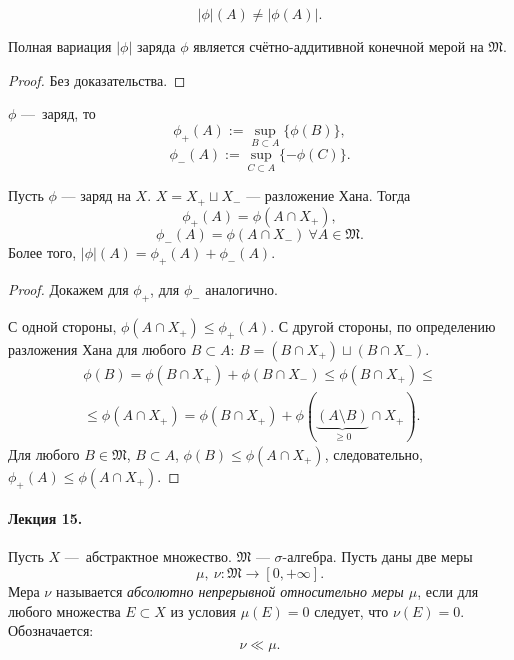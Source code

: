 \begin{remark}
    \[|\phi|(A) \neq |\phi(A)|.\]
\end{remark}

\begin{theorem}
    Полная вариация $|\phi|$ заряда $\phi$ является счётно-аддитивной конечной мерой на $\mathfrak{M}$.
\end{theorem} 
\begin{proof}
    Без доказательства.
\end{proof} 

\begin{remark}
    $\phi$ — заряд, то
    \[\phi_+(A) := \sup\limits_{B \subset A} \{\phi(B)\},\]
    \[\phi_-(A) := \sup\limits_{C \subset A} \{-\phi(C)\}.\]
\end{remark}

\begin{theorem}
    Пусть $\phi$ — заряд на $X$. $X = X_+ \sqcup X_-$ — разложение Хана.
    Тогда
    \[\phi_+(A) = \phi(A \cap X_+),\]
    \[\phi_-(A) = \phi(A \cap X_-) \ \forall A \in \mathfrak{M}.\]
    Более того, $|\phi|(A) = \phi_+(A) + \phi_-(A)$.
\end{theorem} 
\begin{proof}
    Докажем для $\phi_+$, для $\phi_-$ аналогично.
    
    С одной стороны, $\phi(A \cap X_+) \leqslant \phi_+(A)$.
    С другой стороны, по определению разложения Хана для любого $B \subset A$: $B = (B \cap X_+) \sqcup (B \cap X_-)$.
    \begin{multline*}
        \phi(B) = \phi(B \cap X_+) + \phi(B \cap X_-) \leqslant \phi(B \cap X_+) 
        \leqslant\\\leqslant
        \phi(A \cap X_+) = \phi(B \cap X_+) + \phi(\underbrace{(A \setminus B)}_{\geqslant 0} \cap X_+).
    \end{multline*} 
    Для любого $B \in \mathfrak{M}$, $B \subset A$, $\phi(B) \leqslant \phi(A \cap X_+)$, следовательно, $\phi_+(A) \leqslant \phi(A \cap X_+)$.
\end{proof} 

\paragraph{Лекция 15.}
\begin{definition}
    Пусть $X$ — абстрактное множество. $\mathfrak{M}$ — $\sigma$-алгебра. Пусть даны две меры
    \[\mu, \ \nu: \mathfrak{M} \to [0, +\infty].\]
    Мера $\nu$ называется \textit{абсолютно непрерывной относительно меры $\mu$}, если для любого множества $E \subset X$ из условия $\mu(E)=0$ следует, что $\nu(E)=0$.
    Обозначается:
    \[\nu \ll \mu.\]
\end{definition} 

